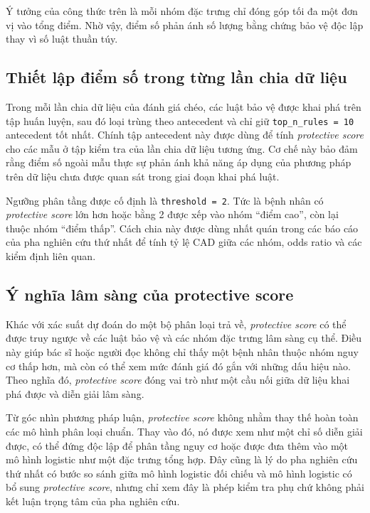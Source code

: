 Ý tưởng của công thức trên là mỗi nhóm đặc trưng chỉ đóng góp tối đa một đơn vị vào tổng điểm. Nhờ vậy, điểm số phản ánh số lượng bằng chứng bảo vệ độc lập thay vì số luật thuần túy.

\blocksep

\subsection{Thiết lập điểm số trong từng lần chia dữ liệu}

\blocksep

Trong mỗi lần chia dữ liệu của đánh giá chéo, các luật bảo vệ được khai phá trên tập huấn luyện, sau đó loại trùng theo antecedent và chỉ giữ \texttt{top\_n\_rules = 10} antecedent tốt nhất. Chính tập antecedent này được dùng để tính \textit{protective score} cho các mẫu ở tập kiểm tra của lần chia dữ liệu tương ứng. Cơ chế này bảo đảm rằng điểm số ngoài mẫu thực sự phản ánh khả năng áp dụng của phương pháp trên dữ liệu chưa được quan sát trong giai đoạn khai phá luật.

\blocksep

Ngưỡng phân tầng được cố định là \texttt{threshold = 2}. Tức là bệnh nhân có \textit{protective score} lớn hơn hoặc bằng 2 được xếp vào nhóm “điểm cao”, còn lại thuộc nhóm “điểm thấp”. Cách chia này được dùng nhất quán trong các báo cáo của pha nghiên cứu thứ nhất để tính tỷ lệ CAD giữa các nhóm, odds ratio và các kiểm định liên quan.

\blocksep

\subsection{Ý nghĩa lâm sàng của protective score}

\blocksep

Khác với xác suất dự đoán do một bộ phân loại trả về, \textit{protective score} có thể được truy ngược về các luật bảo vệ và các nhóm đặc trưng lâm sàng cụ thể. Điều này giúp bác sĩ hoặc người đọc không chỉ thấy một bệnh nhân thuộc nhóm nguy cơ thấp hơn, mà còn có thể xem mức đánh giá đó gắn với những dấu hiệu nào. Theo nghĩa đó, \textit{protective score} đóng vai trò như một cầu nối giữa dữ liệu khai phá được và diễn giải lâm sàng.

\blocksep

Từ góc nhìn phương pháp luận, \textit{protective score} không nhằm thay thế hoàn toàn các mô hình phân loại chuẩn. Thay vào đó, nó được xem như một chỉ số diễn giải được, có thể đứng độc lập để phân tầng nguy cơ hoặc được đưa thêm vào một mô hình logistic như một đặc trưng tổng hợp. Đây cũng là lý do pha nghiên cứu thứ nhất có bước so sánh giữa mô hình logistic đối chiếu và mô hình logistic có bổ sung \textit{protective score}, nhưng chỉ xem đây là phép kiểm tra phụ chứ không phải kết luận trọng tâm của pha nghiên cứu.

